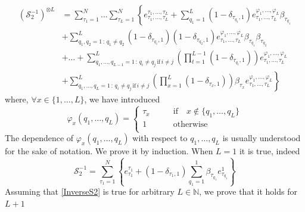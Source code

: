 \documentclass[10pt]{article}
\numberwithin{equation}{section}
\numberwithin{equation}{subsection}
\begin{document}
    \begin{equation}\label{InverseS2}
    	\begin{split}
    		\left(\mathcal{S}_{2}^{-1}\right)^{\otimes L}&=\sum_{\tau_{1}=1}^{N}\ldots\sum_{\tau_{L}=1}^{N}\left\{e_{\tau_{1},\ldots,\tau_{L}}^{\tau_{1},\ldots,\tau_{L}}+\sum_{q_{1}=1}^{L}(1-\delta_{\tau_{q_{1}},1})e_{\tau_{1},\ldots,\tau_{L}}^{\varphi_{1},\ldots,\varphi_{L}}\beta_{\tau_{q_{1}}}\right. 
    		\\&+\left. \sum_{q_{1},q_{2}=1\,:\,q_{1}\neq q_{2}}^{L}(1-\delta_{\tau_{q_{1}},1})(1-\delta_{\tau_{q_{2}},1})e^{\varphi_{1},\ldots,\varphi_{L}}_{\tau_{1},\ldots,\tau_{L}}\beta_{\tau_{q_{1}}}\beta_{\tau_{q_{2}}}\right.
    		\\&+\left.
    		\ldots+	\sum_{q_{1},\ldots,q_{L-1}=1\,:\,q_{i}\neq q_{j}\,\text{if}\,i\neq j}^{L}\left(\prod_{t=1}^{L-1}(1-\delta_{\tau_{q_{t}},1})\right)e_{\tau_{1},\ldots,\tau_{L}}^{\varphi_{1},\ldots,\varphi_{L}}
    		\right. \\&+ \left. 
    		\sum_{q_{1},\ldots,q_{L}=1\,:\,q_{i}\neq q_{j}\,\text{if}\,i\neq j}^{L}\left(\prod_{x=1}^{L}(1-\delta_{\tau_{x},1})\right)\beta_{\tau_{x}}e_{\tau_{1},\ldots,\tau_{L}}^{\varphi_{1},\ldots,\varphi_{L}} \right\}
    	\end{split}
    \end{equation}
where, $\forall x\in\{1,\ldots,L\}$, we have introduced
\begin{equation}
	\varphi_{x}(q_{1},\ldots,q_{L})=\begin{cases}
		\tau_{x}\qquad &\text{if}\quad x\notin\{q_{1},\ldots,q_{L}\}\\
		1\qquad &\text{otherwise}\\
	\end{cases}
\end{equation}
The dependence of $\varphi_{x}(q_{1},\ldots,q_{L})$ with respect to $q_{1},\ldots,q_{L}$ is usually understood for the sake of notation.
    We prove it by induction. When $L=1$ it is true, indeed
    \begin{equation}
    	\mathcal{S}_{2}^{-1}=\sum_{\tau_{1}=1}^{N}\left\{e_{\tau_{1}}^{\tau_{1}}+(1-\delta_{\tau_{1},1})\sum_{q_{1}=1}^{1}\beta_{\tau_{q_{1}}}e_{\tau_{q_{1}}}^{1}\right\}
    \end{equation}
    Assuming that \eqref{InverseS2} is true for arbitrary $L\in \mathbb{N}$, we prove that it holds for $L+1$
\end{document}
